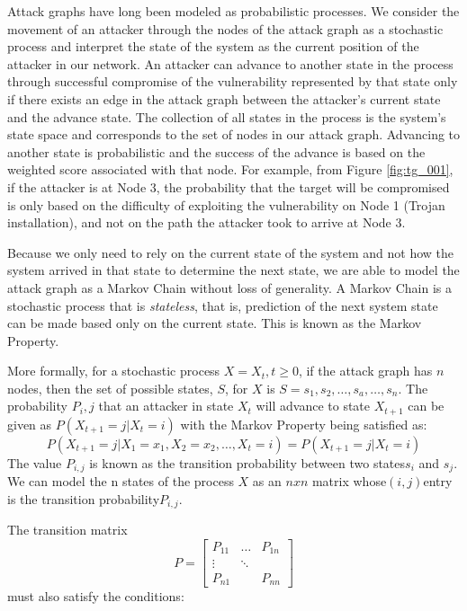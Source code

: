 
Attack graphs have long been modeled as probabilistic processes\cite{ Dacier_Deswarte_Kaaniche, Ortalo_1999, Phillips_Swiler_1998, Weiss_1991}. We consider the movement of an attacker through the nodes of the attack graph as a stochastic process and interpret the state of the system as the current position of the attacker in our network. An attacker can advance to another state in the process through successful compromise of the vulnerability represented by that state only if there exists an edge in the attack graph between the attacker’s current state and the advance state.  The collection of all states in the process is the system’s state space and corresponds to the set of nodes in our attack graph. Advancing to another state is probabilistic and the success of the advance is based on the weighted score associated with that node. For example, from Figure \ref{fig:tg_001}, if the attacker is at Node 3, the probability that the target will be compromised is only based on the difficulty of exploiting the vulnerability on Node 1 (Trojan installation), and not on the path the attacker took to arrive at Node 3.

Because we only need to rely on the current state of the system and not how the system arrived in that state to determine the next state, we are able to model the attack graph as a Markov Chain without loss of generality. A Markov Chain is a stochastic process that is \textit{stateless}, that is, prediction of the next system state can be made based only on the current state. This is known as the Markov Property.  

More formally, for a stochastic process \(X = {X_t, t \geq 0}\), if the attack graph has \(n\) nodes, then the set of possible states, \(S\), for \(X\) is \(S = {s_1, s_2, \ldots, s_a, \ldots, s_n}\). The probability \(P_i,j\) that an attacker in state \(X_t\) will advance to state \(X_{t+1}\) can be given as \(P(X_{t+1} = j | X_t = i)\) with the Markov Property being satisfied as: 
\[P(X_{t+1} = j | X_1 = x_1 , X_2 = x_2 , \ldots, X_t = i)  = P(X_{t+1} = j | X_t = i) \]
The value \( P_{i,j}\) is known as the transition probability between two states\( s_i\) and \(s_j\). We can model the n states of the process \(X\) as an \(nxn\) matrix whose\( (i, j) \)entry is the transition probability\( P_{i,j}\).

The transition matrix
\[
P = \begin{bmatrix} 
    P_{11} & \dots & P_{1n}  \\
    \vdots & \ddots & \\
    P_{n1} &        & P_{nn} 
    \end{bmatrix}
\]
must also satisfy the conditions:  

